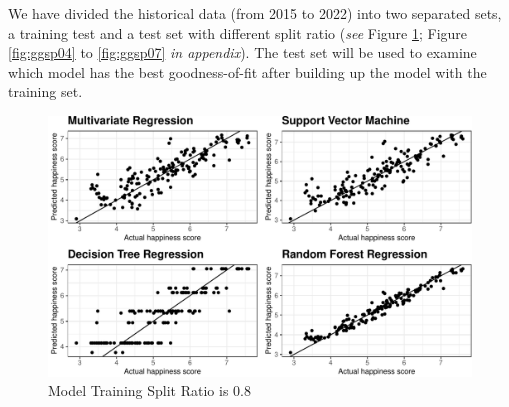 \documentclass[11pt,a4paper,]{article}
\begin{document}
\begin{table}[H]
\caption{Model Description of our Possible Models}
\label{models}
\end{table}

We have divided the historical data (from 2015 to 2022) into two separated sets, a training test and a test set with different split ratio (\emph{see} Figure \ref{fig:training}; Figure \ref{fig:ggsp04} to \ref{fig:ggsp07} \emph{in appendix}). The test set will be used to examine which model has the best goodness-of-fit after building up the model with the training set.

\newpage

\begin{figure}
\centering
\includegraphics{Assignment4_files/figure-latex/training-1.pdf}
\caption{\label{fig:training}Model Training Split Ratio is 0.8}
\end{figure}
\end{document}
